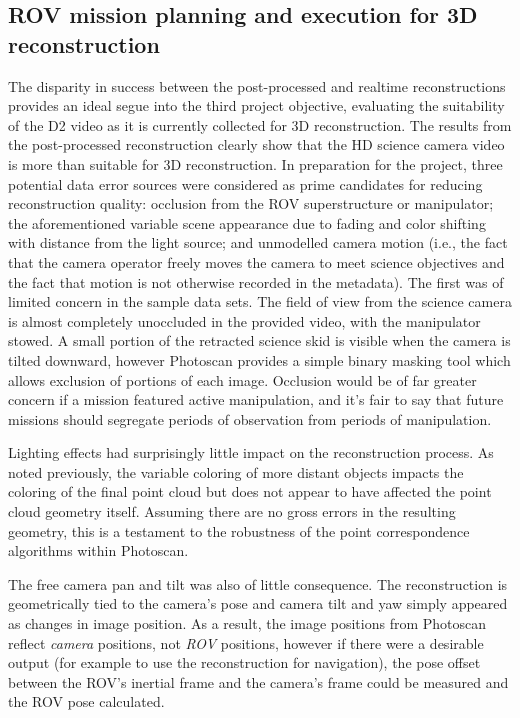 \documentclass[letterpaper,12pt]{article}
\begin{document}
 
 
\subsection{ROV mission planning and execution for 3D reconstruction}

The disparity in success between the post-processed and realtime reconstructions provides an ideal segue into the third project objective, evaluating the suitability of the D2 video as it is currently collected for 3D reconstruction.  The results from the post-processed reconstruction clearly show that the HD science camera video is more than suitable for 3D reconstruction.  In preparation for the project, three potential data error sources were considered as prime candidates for reducing reconstruction quality:   occlusion from the ROV superstructure or manipulator; the aforementioned variable scene appearance due to fading and color shifting with distance from the light source; and unmodelled camera motion (i.e., the fact that the camera operator freely moves the camera to meet science objectives and the fact that motion is not otherwise recorded in the metadata).     The first was of limited concern in the sample data sets.    The field of view from the science camera is almost completely unoccluded in the provided video, with the manipulator stowed.   A small portion of the retracted science skid is visible when the camera is tilted downward, however Photoscan provides a simple binary masking tool which allows exclusion of portions of each image.   Occlusion would be of far greater concern if a mission featured active manipulation, and it's fair to say that future missions should segregate periods of observation from periods of manipulation.

Lighting effects had surprisingly little impact on the reconstruction process.  As noted previously, the variable coloring of more distant objects impacts the coloring of the final point cloud but does not appear to have affected the point cloud geometry itself.   Assuming there are no gross errors in the resulting geometry, this is a testament to the robustness of the point correspondence algorithms within Photoscan.  

The free camera pan and tilt was also of little consequence.  The reconstruction is geometrically tied to the camera's pose and camera tilt and yaw simply appeared as changes in image position.  As a result, the image positions from Photoscan reflect \textit{camera} positions, not \textit{ROV} positions, however if there were a desirable output (for example to use the reconstruction for navigation), the pose offset between the ROV's inertial frame and the camera's frame could be measured and the ROV pose calculated.
\end{document}
